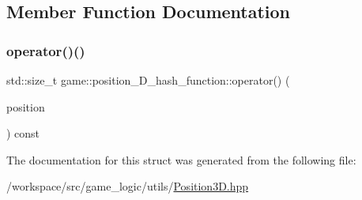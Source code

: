 \subsection{Member Function Documentation}
\mbox{\label{structgame_1_1position__3_d__hash__function_a2b37455862d9f2c135ecd7dab07f8781}} 
\subsubsection{\texorpdfstring{operator()()}{operator()()}}
{\footnotesize\ttfamily std\+::size\+\_\+t game\+::position\+\_\+D\+\_\+hash\+\_\+function\+::operator() (\begin{DoxyParamCaption}\item[{const \hyperlink{structgame_1_1_position3_d}{Position3D} \&}]{position }\end{DoxyParamCaption}) const\hspace{0.3cm}{\ttfamily [inline]}}



The documentation for this struct was generated from the following file\+:\begin{DoxyCompactItemize}
\item 
/workspace/src/game\+\_\+logic/utils/\hyperlink{_position3_d_8hpp}{Position3\+D.\+hpp}\end{DoxyCompactItemize}
